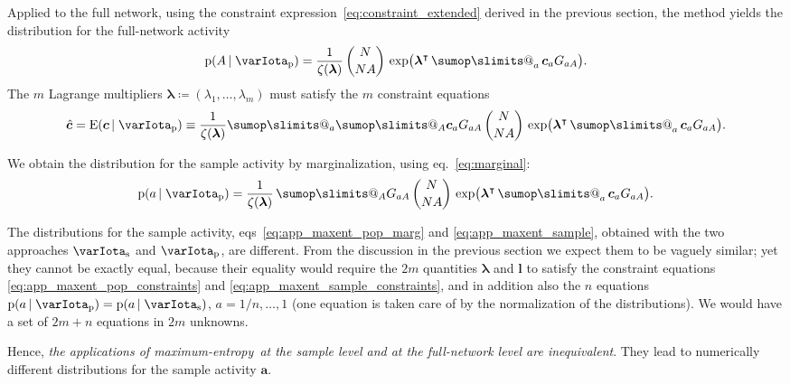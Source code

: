 \documentclass[\ifafour a4paper,12pt,\else a5paper,10pt,\fi%
onecolumn,oneside,article,%
british%
]{memoir}
\makeatletter
\theoremstyle{remark}
\theoremstyle{innote}
\def\sum{\DOTSI\sumop\slimits@}
\newcommand*{\defd}{\coloneqq}
\newcommand*{\pf}{\mathrm{p}}%
\newcommand*{\E}{\mathrm{E}}
\renewcommand*{\|}[1][]{\nonscript\,#1\vert\nonscript\;\mathopen{}}
\newcommand*{\eqn}{eq.}%
\newcommand*{\eqns}{eqs}%
\newcommand*{\tsum}{\mathop{\textstyle\sum}\nolimits}
\newcommand*{\T}{^\intercal}%
\newcommand*{\ypp}{G}
\newcommand*{\yAv}{A}
\newcommand*{\yav}{a}
\newcommand*{\yNv}{N}
\newcommand*{\yaa}{\bm{\yav}}%
\newcommand*{\ya}{\yav}%
\newcommand*{\yA}{\yAv}%
\newcommand*{\yHa}{\varIota_\textrm{p}}
\newcommand*{\yHb}{\varIota_\textrm{s}}
\newcommand*{\yg}{\bm{c}}
\newcommand*{\yc}{\Hat{\bm{c}}}
\newcommand*{\yll}{\bm{\lambda}}
\newcommand*{\yl}{\bm{l}}
\newcommand*{\yK}{\zeta}
\newcommand*{\me}{maximum-entropy}
\makeatother
\begin{document}
Applied to the full network, using the constraint
expression~\eqref{eq:constraint_extended} derived in the previous section,
the method yields the distribution for the full-network activity
\begin{equation}
  \label{eq:app_maxent_pop}
  \pf(\yA \| \yHa)  = \frac{1}{\yK(\yll)}\,
  \binom{\yNv}{\yNv \yA}\,\exp\bigl(\yll\T
  \tsum_{\ya} \yg_{\ya}\ypp_{\ya\yA}\bigr).
\end{equation}
The $m$ Lagrange multipliers $\yll\defd (\lambda_1,\dotsc,\lambda_m)$ must
satisfy the $m$ constraint equations
\begin{equation}
  \label{eq:app_maxent_pop_constraints}
  \yc = \E(\yg \|\yHa)\equiv %
 \frac{1}{\yK(\yll)}\sum_{\ya} \sum_{\yA} \yg_{\ya} \ypp_{\ya \yA}
\,
  \binom{\yNv}{\yNv \yA}\,\exp\bigl(\yll\T
  \tsum_{\ya} \yg_{\ya}\ypp_{\ya\yA}\bigr).
\end{equation}

We obtain the distribution for the sample activity by marginalization, using
\eqn~\eqref{eq:marginal}:
\begin{equation}
  \label{eq:app_maxent_pop_marg}
  \pf(\ya \| \yHa)  = \frac{1}{\yK(\yll)}\, 
  \sum_{\yA} \ypp_{\ya \yA}
\,
  \binom{\yNv}{\yNv \yA}\,\exp\bigl(\yll\T
  \tsum_{\ya} \yg_{\ya}\ypp_{\ya\yA}\bigr).
\end{equation}

The distributions for the sample activity,
\eqns~\eqref{eq:app_maxent_pop_marg} and \eqref{eq:app_maxent_sample},
obtained with the two approaches $\yHb$ and $\yHa$, are different. From the
discussion in the previous section we expect them to be vaguely similar;
yet they cannot be exactly equal, because their equality would require the
$2m$ quantities $\yll$ and $\yl$ to satisfy the constraint equations
\eqref{eq:app_maxent_pop_constraints} and
\eqref{eq:app_maxent_sample_constraints}, and in addition also the $n$
equations $\pf(\ya \| \yHa) = \pf(\ya \| \yHb)$,
$\ya=1/n,\dotsc,1$ (one equation is taken care of by the normalization of
the distributions). We would have a set of $2m+n$ equations in $2m$
unknowns.

Hence, \emph{the applications of \me\ at the sample level and at the
  full-network level are inequivalent}. They lead to numerically
different distributions for the sample activity $\yaa$.
\end{document}
